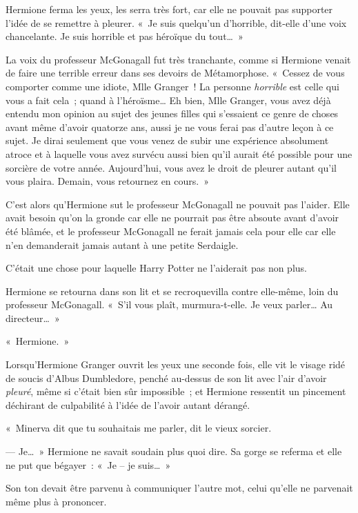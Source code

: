 Hermione ferma les yeux, les serra très fort, car elle ne pouvait pas supporter l'idée de se remettre à pleurer. «~Je suis quelqu'un d'horrible, dit-elle d'une voix chancelante. Je suis horrible et pas héroïque du tout…~»

La voix du professeur McGonagall fut très tranchante, comme si Hermione venait de faire une terrible erreur dans ses devoirs de Métamorphose. «~Cessez de vous comporter comme une idiote, Mlle Granger~! La personne \emph{horrible} est celle qui vous a fait cela~; quand à l'héroïsme… Eh bien, Mlle Granger, vous avez déjà entendu mon opinion au sujet des jeunes filles qui s'essaient ce genre de choses avant même d'avoir quatorze ans, aussi je ne vous ferai pas d'autre leçon à ce sujet. Je dirai seulement que vous venez de subir une expérience absolument atroce et à laquelle vous avez survécu aussi bien qu'il aurait été possible pour une sorcière de votre année. Aujourd'hui, vous avez le droit de pleurer autant qu'il vous plaira. Demain, vous retournez en cours.~»

C'est alors qu'Hermione sut le professeur McGonagall ne pouvait pas l'aider. Elle avait besoin qu'on la gronde car elle ne pourrait pas être absoute avant d'avoir été blâmée, et le professeur McGonagall ne ferait jamais cela pour elle car elle n'en demanderait jamais autant à une petite Serdaigle.

C'était une chose pour laquelle Harry Potter ne l'aiderait pas non plus.

Hermione se retourna dans son lit et se recroquevilla contre elle-même, loin du professeur McGonagall. «~S'il vous plaît, murmura-t-elle. Je veux parler… Au directeur…~»

\later

«~Hermione.~»

Lorsqu'Hermione Granger ouvrit les yeux une seconde fois, elle vit le visage ridé de soucis d'Albus Dumbledore, penché au-dessus de son lit avec l'air d'avoir \emph{pleuré}, même si c'était bien sûr impossible~; et Hermione ressentit un pincement déchirant de culpabilité à l'idée de l'avoir autant dérangé.

«~Minerva dit que tu souhaitais me parler, dit le vieux sorcier.

--- Je…~» Hermione ne savait soudain plus quoi dire. Sa gorge se referma et elle ne put que bégayer~: «~Je -- je suis…~»

Son ton devait être parvenu à communiquer l'autre mot, celui qu'elle ne parvenait même plus à prononcer.

